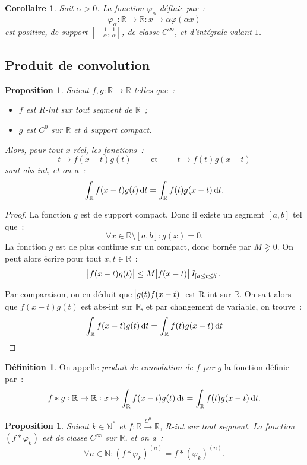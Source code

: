 \documentclass{report}
\newtheorem{prp}[thm]{Proposition}
\newtheorem{cor}[thm]{Corollaire}
\theoremstyle{definition}
\newtheorem{déf}[thm]{Définition}
\theoremstyle{remark}
\newcommand{\R}{\mathbb R}
\newcommand{\N}{\mathbb N}
\newcommand{\Ns}{\N^{*}}
\newcommand{\toC}[1]{\xrightarrow{C^{#1}}}
\begin{document}
			\begin{cor}\label{cor:varphi_k}Soit $\alpha > 0$. La fonction $\varphi_\alpha$ définie par~:
			\[\varphi_\alpha : \R \to \R : x \mapsto \alpha\varphi(\alpha x)\]
			est positive, de support $\left[-\frac 1\alpha, \frac 1\alpha\right]$, de classe $C^\infty$, et d'intégrale valant $1$.
			\end{cor}

		\subsection{Produit de convolution}
			\begin{prp} Soient $f, g : \R \to \R$ telles que~:
			\begin{itemize}
				\item $f$ est R-int sur tout segment de $\R$~;
				\item $g$ est $C^0$ sur $\R$ et à support compact.
			\end{itemize}

			Alors, pour tout $x$ réel, les fonctions~:
			\[t \mapsto f(x-t)g(t)\qquad\text{ et }\qquad t \mapsto f(t)g(x-t)\]
			sont abs-int, et on a~:
			\[\int_\R f(x-t)g(t)\dif t = \int_\R f(t)g(x-t)\dif t.\]
			\end{prp}

			\begin{proof} La fonction $g$ est de support compact. Donc il existe un segment $[a, b]$ tel que~:
			\[\forall x \in \R \setminus [a, b] : g(x) = 0.\]
			La fonction $g$ est de plus continue sur un compact, donc bornée par $M \gneqq 0$. On peut alors écrire pour tout $x, t \in \R$~:
			\[\abs {f(x-t)g(t)} \leq M\abs {f(x-t)}I_{\left[a \leq t \leq b\right]}.\]

			Par comparaison, on en déduit que $\abs {g(t)f(x-t)}$ est R-int sur $\R$. On sait alors que $f(x-t)g(t)$ est abs-int sur $\R$, et par changement de
			variable, on trouve~:
			\[\int_\R f(x-t)g(t)\dif t = \int_\R f(t)g(x-t)\dif t\]

			\end{proof}

			\begin{déf} On appelle \textit{produit de convolution de $f$ par $g$} la fonction définie par~:
			\[f * g : \R \to \R : x \mapsto \int_\R f(x-t)g(t)\dif t = \int_\R f(t)g(x-t)\dif t.\]
			\end{déf}

			\begin{prp}\label{prp:(f*varphi)'=f*varphi'} Soient $k \in \Ns$ et $f : \R \toC0 \R$, R-int sur tout segment. La fonction $(f * \varphi_k)$ est
			de classe $C^\infty$ sur $\R$, et on a~:
			\[\forall n \in \N : (f * \varphi_k)^{(n)} = f * (\varphi_k)^{(n)}.\]
			\end{prp}
\end{document}
